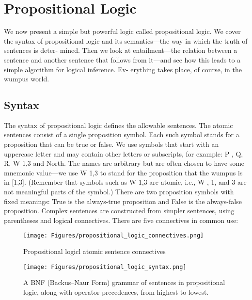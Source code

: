 \section{Propositional Logic}


We now present a simple but powerful logic called propositional logic. We cover the syntax
of propositional logic and its semantics—the way in which the truth of sentences is deter-
mined. Then we look at entailment—the relation between a sentence and another sentence
that follows from it—and see how this leads to a simple algorithm for logical inference. Ev-
erything takes place, of course, in the wumpus world.


\subsection{Syntax}


The syntax of propositional logic defines the allowable sentences. The atomic sentences
consist of a single proposition symbol. Each such symbol stands for a proposition that can
be true or false. We use symbols that start with an uppercase letter and may contain other
letters or subscripts, for example: P , Q, R, W 1,3 and North. The names are arbitrary but
are often chosen to have some mnemonic value—we use W 1,3 to stand for the proposition
that the wumpus is in [1,3]. (Remember that symbols such as W 1,3 are atomic, i.e., W , 1,
and 3 are not meaningful parts of the symbol.) There are two proposition symbols with fixed
meanings: True is the always-true proposition and False is the always-false proposition.
Complex sentences are constructed from simpler sentences, using parentheses and logical
connectives. There are five connectives in common use:


\begin{figure}[H]
    \centering
    \texttt{[image: Figures/propositional\_logic\_connectives.png]}
    \caption{Propositional logicl atomic sentence connectives}
    \label{fig:connectives}
\end{figure}


\begin{figure}[H]
    \centering
    \texttt{[image: Figures/propositional\_logic\_syntax.png]}
    \caption{A BNF (Backus–Naur Form) grammar of sentences in propositional logic,
along with operator precedences, from highest to lowest.}
    \label{fig:connectives}
\end{figure}
